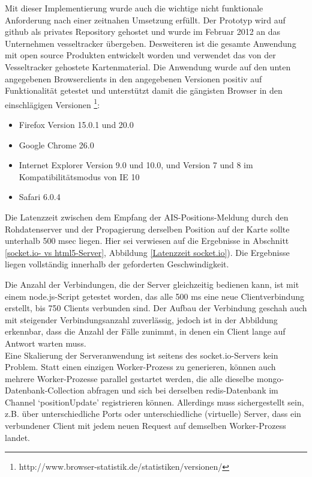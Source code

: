 Mit dieser Implementierung wurde auch die wichtige nicht funktionale Anforderung nach einer zeitnahen Umsetzung erfüllt. Der Prototyp wird auf github als privates Repository gehostet und wurde im Februar 2012 an das Unternehmen vesseltracker übergeben.
Desweiteren ist die gesamte Anwendung mit open source Produkten entwickelt worden und verwendet das von der Vesseltracker gehostete Kartenmaterial.\newline
Die Anwendung wurde auf den unten angegebenen Browserclients in den angegebenen Versionen positiv auf Funktionalität getestet und unterstützt damit die gängisten Browser in den einschlägigen Versionen \footnote{http://www.browser-statistik.de/statistiken/versionen/}:
\begin{itemize}
\item Firefox Version 15.0.1 und 20.0
\item Google Chrome 26.0
\item Internet Explorer Version 9.0 und 10.0, und Version 7 und 8 im Kompatibilitätsmodus von IE 10
\item Safari 6.0.4
\end {itemize}

Die Latenzzeit zwischen dem Empfang der AIS-Positions-Meldung durch den Rohdatenserver und der Propagierung derselben Position auf der Karte sollte unterhalb 500 msec liegen. Hier sei verwiesen auf die Ergebnisse in Abschnitt \ref{socket.io- vs html5-Server}, Abbildung \ref{Latenzzeit socket.io}). Die Ergebnisse liegen vollständig innerhalb der geforderten Geschwindigkeit.


Die Anzahl der Verbindungen, die der Server gleichzeitig bedienen kann, ist mit einem node.js-Script getestet worden, das alle 500 ms eine neue Clientverbindung erstellt, bis 750 Clients verbunden sind. Der Aufbau der Verbindung geschah auch mit steigender Verbindungsanzahl zuverlässig, jedoch ist in der Abbildung erkennbar, dass die Anzahl der Fälle zunimmt, in denen ein Client lange auf Antwort warten muss.
\\Eine Skalierung der Serveranwendung ist seitens des socket.io-Servers kein Problem. Statt einen einzigen Worker-Prozess zu generieren, können auch mehrere Worker-Prozesse parallel gestartet werden, die alle dieselbe mongo-Datenbank-Collection abfragen und sich bei derselben redis-Datenbank im Channel ‘positionUpdate’ registrieren können. Allerdings muss sichergestellt sein, z.B.  über unterschiedliche Ports oder unterschiedliche (virtuelle) Server, dass ein verbundener Client mit jedem neuen Request auf demselben Worker-Prozess landet.

